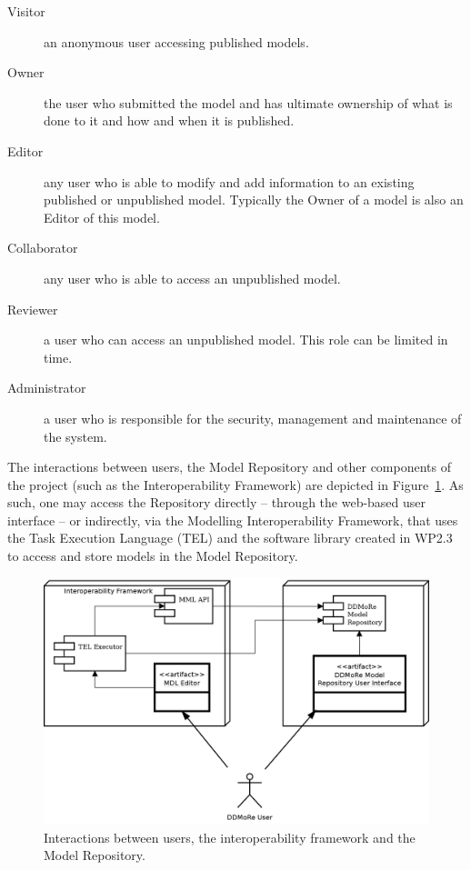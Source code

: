\begin{description}
  \item[Visitor] an anonymous user accessing \glspl{published model}.
  \item[Owner] the user who submitted the model and has ultimate ownership of what is done to it and how and
when it is published.
  \item[Editor] any user who is able to modify and add information to an existing published or \gls{unpublished model}. Typically the Owner of a model is also an Editor of this model.
  \item[Collaborator] any user who is able to access an unpublished model.
  \item[Reviewer] a user who can access an unpublished model. This role can be limited in time.
  \item[Administrator] a user who is responsible for the security, management and maintenance of the system.
\end{description}

The interactions between users, the Model Repository and other components of the project (such as the Interoperability Framework) are depicted in Figure~\ref{fig:userInteraction}. As such, one may access the Repository directly -- through the web-based user interface -- or indirectly, via the Modelling Interoperability Framework, that uses the Task Execution Language (TEL) and the software library created in WP2.3 to access and store models in the \ddmore Model Repository.

\begin{figure}[htb]
\centering
\includegraphics{img/UserInteraction}
\caption{Interactions between users, the interoperability framework and the Model Repository.}
\label{fig:userInteraction}
\end{figure}
